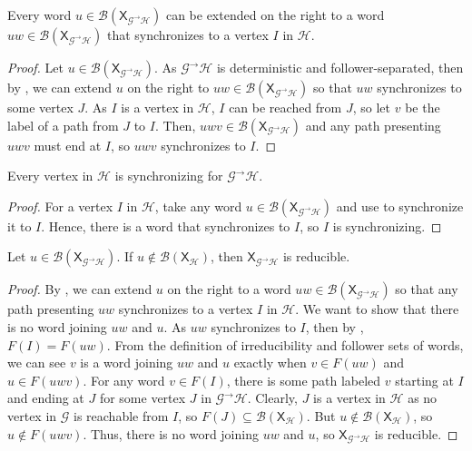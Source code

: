 \documentclass[hidelinks]{report}
\newcommand{\Gc}{\mathcal{G}}  %
\newcommand{\Hc}{\mathcal{H}}  %
\newcommand{\Bc}{\mathcal{B}}
\newcommand{\GtH}{{\Gc^\to\Hc}}
\newcommand{\shift}[1]{\mathsf{X}_{#1}}
\theoremstyle{definition}
\begin{document}
\begin{proposition}\label{extensionthm}
    Every word \(u \in \Bc(\shift{\GtH})\) can be extended on the right to a 
    word \(u w \in \Bc(\shift{\GtH})\) that synchronizes to a vertex \(I\) in \(\Hc\).
\end{proposition}

\begin{proof}
    Let \(u \in \Bc(\shift{\GtH})\). As \(\GtH\) is deterministic and 
    follower-separated, then by \cite[Proposition 3.3.16]{lind1995introduction}, we can 
    extend \(u\) on the right to \(uw \in \Bc(\shift{\GtH})\) so that \(uw\)
    synchronizes to some vertex \(J\). As \(I\) is a vertex in \(\Hc\), 
    \(I\) can be reached from \(J\), so let \(v\) be  the label of a path 
    from \(J\) to \(I\). Then, \(uwv \in \Bc(\shift{\GtH})\) and any path presenting 
    \(uwv\) must end at \(I\), so \(uwv\) synchronizes to \(I\).
\end{proof}

\begin{corollary}\label{hsync}
    Every vertex in \(\Hc\) is synchronizing for \(\GtH\). 
\end{corollary}

\begin{proof}
    For a vertex \(I\) in \(\Hc\), take any word \(u \in \Bc(\shift{\GtH})\) and
    use  to synchronize it to \(I\). Hence, there is a word that synchronizes 
    to \(I\), so \(I\) is synchronizing.
\end{proof}

\begin{lemma}\label{wordlemma}
    Let \(u \in \Bc(\shift{\GtH})\). If \(u \notin \Bc(\shift{\Hc})\), then \(\shift{\GtH}\) is 
    reducible.
\end{lemma}

\begin{proof}
    By , we can extend \(u\) on the right to a word \(uw \in \Bc(\shift{\GtH})\)
    so that any path presenting \(uw\) synchronizes to a vertex \(I\) in \(\Hc\). 
    We want to show that there is no word joining \(uw\) and \(u\). As \(uw\)
    synchronizes to \(I\), then by \cite[Lemma 3.3.15]{lind1995introduction}, \(F(I) = F(uw)\). 
    From the definition of irreducibility and follower sets of words, we 
    can see \(v\) is a word joining \(uw\) and \(u\)
    exactly when \(v \in F(uw)\) and \(u \in F(uwv)\).
    For any word \(v \in F(I)\), there is some path labeled \(v\) starting 
    at \(I\) and ending at \(J\) for some vertex \(J\) in \(\GtH\). Clearly,
    \(J\) is a vertex in \(\Hc\) as no vertex in \(\Gc\) is reachable from \(I\), so 
    \(F(J) \subseteq \Bc(\shift{\Hc})\).
    But \(u \notin \Bc(\shift{\Hc})\), so \(u \notin F(uwv)\). Thus, there is no word joining
    \(uw\) and \(u\), so \(\shift{\GtH}\) is reducible.
\end{proof}
\end{document}
